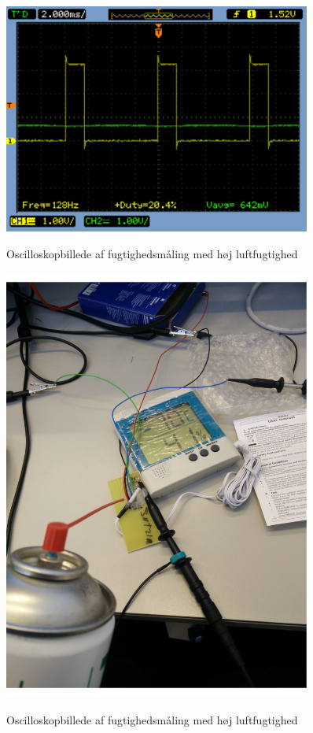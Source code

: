 \begin{figure}[H]
\centering
{\includegraphics[width=0.90\textwidth]{filer/modultest/Billeder/SCOP_tempKOLD}}
\caption{Oscilloskopbillede af fugtighedsmåling med høj luftfugtighed}
\label{lab:SCOP_TEMP_KOLD}
\end{figure}

\begin{figure}[H]
\centering
{\includegraphics[width=0.90\textwidth]{filer/modultest/Billeder/test_KOLD}}
\caption{Oscilloskopbillede af fugtighedsmåling med høj luftfugtighed}
\label{lab:TEST_KOLD}
\end{figure}


